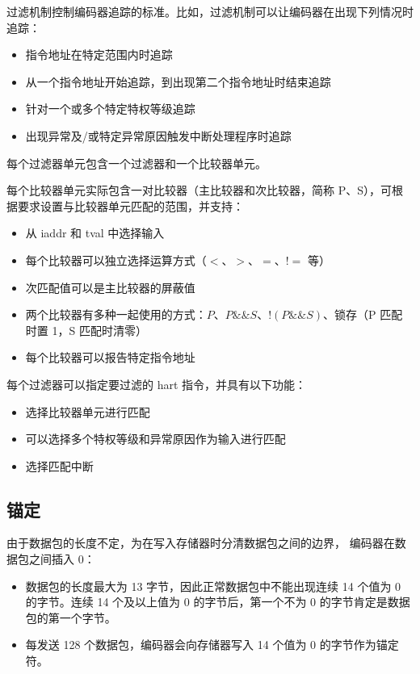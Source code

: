 \documentclass[main\_\_CN.tex]{subfiles}
\begin{document}
过滤机制控制编码器追踪的标准。比如，过滤机制可以让编码器在出现下列情况时追踪：
\begin{itemize}
    \item 指令地址在特定范围内时追踪
    \item 从一个指令地址开始追踪，到出现第二个指令地址时结束追踪
    \item 针对一个或多个特定特权等级追踪
    \item 出现异常及/或特定异常原因触发中断处理程序时追踪
\end{itemize}

每个过滤器单元包含一个过滤器和一个比较器单元。

每个比较器单元实际包含一对比较器（主比较器和次比较器，简称 P、S），可根据要求设置与比较器单元匹配的范围，并支持：

\begin{itemize}
    \item 从 iaddr 和 tval 中选择输入
    \item 每个比较器可以独立选择运算方式（$<$、$>$、$=$、$!=$ 等）
    \item 次匹配值可以是主比较器的屏蔽值
    \item 两个比较器有多种一起使用的方式：$P$、$P\&\&S$、$!(P\&\&S)$、锁存（P 匹配时置 1，S 匹配时清零）
    \item 每个比较器可以报告特定指令地址
\end{itemize}

每个过滤器可以指定要过滤的 hart 指令，并具有以下功能：
\begin{itemize}
    \item 选择比较器单元进行匹配
    \item 可以选择多个特权等级和异常原因作为输入进行匹配
    \item 选择匹配中断
\end{itemize}

\subsection{锚定}

由于数据包的长度不定，为在写入存储器时分清数据包之间的边界，\chipname{} 编码器在数据包之间插入 0：
\begin{itemize}
    \item 数据包的长度最大为 13 字节，因此正常数据包中不能出现连续 14 个值为 0 的字节。连续 14 个及以上值为 0 的字节后，第一个不为 0 的字节肯定是数据包的第一个字节。
    \item 每发送 128 个数据包，编码器会向存储器写入 14 个值为 0 的字节作为锚定符。
\end{itemize}
\end{document}
